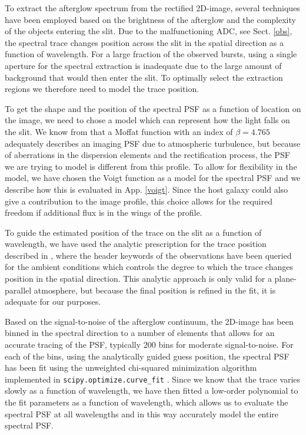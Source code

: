 \documentclass{aa}    %
\begin{document}
To extract the afterglow spectrum from the rectified 2D-image, several
techniques have been employed based on the brightness of the afterglow and the
complexity of the objects entering the slit. Due to the malfunctioning ADC, see
Sect. \ref{obs}, the spectral trace changes position across the slit in the
spatial direction as a function of wavelength. For a large fraction of the
observed bursts, using a single aperture for the spectral extraction is
inadequate due to the large amount of background that would then enter the slit.
To optimally select the extraction regions we therefore need to model the trace
position.

To get the shape and the position of the spectral PSF as a function of location
on the image, we need to chose a model which can represent how the light falls
on the slit. We know from \citet{Trujillo2001} that a Moffat function
\citep{Moffat1969} with an index of $\beta = 4.765$ adequately describes an
imaging PSF due to atmospheric turbulence, but because of aberrations in the
dispersion elements and the rectification process, the PSF we are trying to
model is different from this profile. To allow for flexibility in the model, we
have chosen the Voigt function as a model for the spectral PSF and we describe
how this is evaluated in App. \ref{voigt}. Since the host galaxy could also give
a contribution to the image profile, this choice allows for the required freedom
if additional flux is in the wings of the profile.

To guide the estimated position of the trace on the slit as a function of
wavelength, we have used the analytic prescription for the trace position
described in \citet{Filippenko1982}, where the header keywords of the
observations have been queried for the ambient conditions which controls the
degree to which the trace changes position in the spatial direction. This
analytic approach is only valid for a plane-parallel atmosphere, but because the
final position is refined in the fit, it is adequate for our purposes.

Based on the signal-to-noise of the afterglow continuum, the 2D-image has been
binned in the spectral direction to a number of elements that allows for an
accurate tracing of the PSF, typically 200 bins for moderate signal-to-noise.
For each of the bins, using the analytically guided guess position, the spectral
PSF has been fit using the unweighted chi-squared minimization algorithm
implemented in \texttt{scipy.optimize.curve\_fit} \citep{scipy}. Since we know
that the trace varies slowly as a function of wavelength, we have then fitted a
low-order polynomial to the fit parameters as a function of wavelength, which
allows us to evaluate the spectral PSF at all wavelengths and in this way
accurately model the entire spectral PSF.
\end{document}
